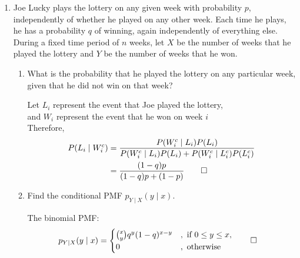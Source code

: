 \documentclass[paper=usletter, fontsize=12pt]{article}
\begin{document}
\begin{enumerate}
        \item Joe Lucky plays the lottery on any given week with probability
        $p$, independently of whether he played on any other week. Each time he
        plays, he has a probability $q$ of winning, again independently of
        everything else. During a fixed time period of $n$ weeks, let $X$ be
        the number of weeks that he played the lottery and $Y$ be the number of
        weeks that he won.
        \begin{enumerate}

            \item What is the probability that he played the lottery on any
            particular week, given that he did not win on that week?
            \begin{cproof}

                Let $L_i$ represent the event that Joe played the lottery, \\
                and $W_i$ represent the event that he won on week $i$ \\
                Therefore,
                \begin{align*}
                    P(L_i \mid W_i^c) &= \frac{P(W_i^c \mid L_i)P(L_i)}{P(W_i^c \mid L_i)P(L_i) + P(W_i^c \mid L_i^c)P(L_i^c)}\\
                    & = \frac{(1-q)p}{(1-q)p+(1-p)} \qedhere
                \end{align*}
                \endgroup

            \end{cproof}

            \item Find the conditional PMF $p_{Y \mid X}(y \mid x)$.
            \begin{cproof}

                The binomial PMF:
                \begin{align*}
                    p_{Y \mid X}(y \mid x) & =
                    \begin{cases}
                        \binom{x}{y}q^y(1-q)^{x-y} &, \text{ if } 0 \le y \le x,\\
                        0 &, \text{ otherwise }
                    \end{cases} \qedhere
                \end{align*}
                \endgroup

            \end{cproof}


\end{enumerate}
\end{enumerate}
\end{document}
